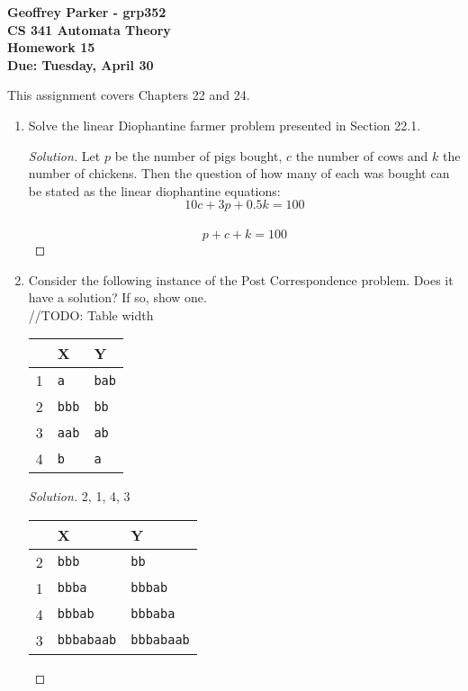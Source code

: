 \documentclass[10pt]{article}
\begin{document}
\begin{flushleft}
\textbf{\noindent
Geoffrey Parker - grp352\\
CS 341 Automata Theory \\
Homework 15 \\
Due: Tuesday, April 30}\\
\end{flushleft}

\noindent
This assignment covers Chapters 22 and 24.\\

\begin{enumerate}[1)]


\item
Solve the linear Diophantine farmer problem presented in Section 22.1.
\begin{proof}[Solution]
Let $p$ be the number of pigs bought, $c$ the number of cows and $k$ the number of chickens.  Then the question of how many of each was bought can be stated as the linear diophantine equations:
\[10c + 3p + 0.5k = 100\]\\
\[p + c + k = 100\]
\end{proof}


\item
Consider the following instance of the Post Correspondence problem.  Does it have a solution?  If so, show one.\\

//TODO: Table width

\begin{tabular}{| l | l | l |}
  \hline
  &X&Y\\
  \hline
  1&\texttt{a}&\texttt{bab}\\
  \hline
  2&\texttt{bbb}&\texttt{bb}\\
  \hline
  3&\texttt{aab}&\texttt{ab}\\
  \hline
  4&\texttt{b}&\texttt{a}\\
  \hline
\end{tabular}
\begin{proof}[Solution]
2, 1, 4, 3\\

\begin{tabular}{l l | l}
&X&Y\\
\hline
2&\texttt{bbb}&\texttt{bb}\\
1&\texttt{bbba}&\texttt{bbbab}\\
4&\texttt{bbbab}&\texttt{bbbaba}\\
3&\texttt{bbbabaab}&\texttt{bbbabaab}\\
\end{tabular}
\end{proof}


\end{enumerate}
\end{document}
